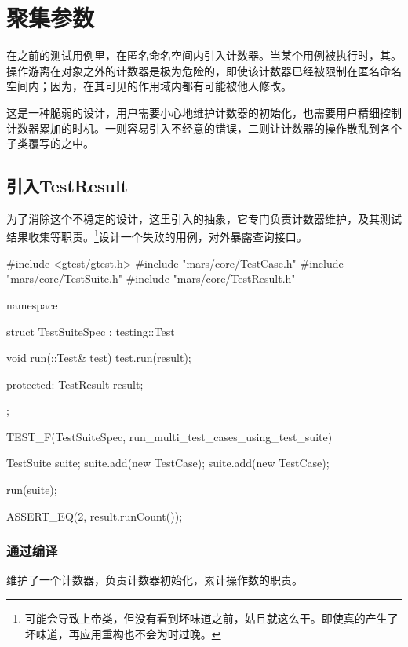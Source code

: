 \section{聚集参数}

\begin{content}

在之前的测试用例里，在匿名命名空间内引入计数器。当某个用例被执行时，其。操作游离在对象之外的计数器是极为危险的，即使该计数器已经被限制在匿名命名空间内；因为，在其可见的作用域内都有可能被他人修改。

这是一种脆弱的设计，用户需要小心地维护计数器的初始化，也需要用户精细控制计数器累加的时机。一则容易引入不经意的错误，二则让计数器的操作散乱到各个子类覆写的之中。

\subsection{引入TestResult}

为了消除这个不稳定的设计，这里引入的抽象，它专门负责计数器维护，及其测试结果收集等职责。\footnote{可能会导致上帝类，但没有看到坏味道之前，姑且就这么干。即使真的产生了坏味道，再应用重构也不会为时过晚。}设计一个失败的用例，对外暴露查询接口。

\begin{leftbar}
 \begin{c++}[caption={\ttfamily{test/mars/core/TestSuiteSpec.cc}}]
#include <gtest/gtest.h>
#include "mars/core/TestCase.h"
#include "mars/core/TestSuite.h"
#include "mars/core/TestResult.h"

namespace {
  struct TestSuiteSpec : testing::Test {
    void run(::Test& test) {
      test.run(result);
    }

  protected:
    TestResult result;
  };
}

TEST_F(TestSuiteSpec, run_multi_test_cases_using_test_suite) {
  TestSuite suite;
  suite.add(new TestCase);
  suite.add(new TestCase);

  run(suite);

  ASSERT_EQ(2, result.runCount());
}
 \end{c++}
\end{leftbar}

\subsubsection{通过编译}

维护了一个计数器，负责计数器初始化，累计操作数的职责。


\end{content}
